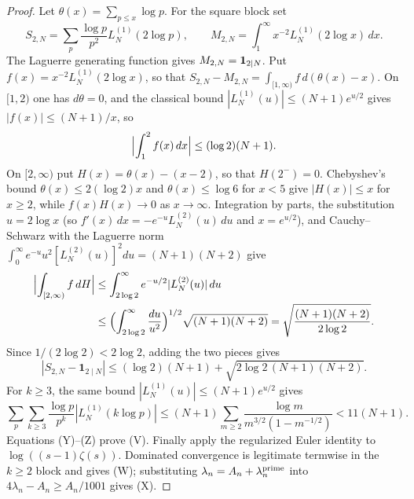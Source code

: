 \documentclass[11pt]{amsart}
\theoremstyle{definition}
\theoremstyle{remark}
\theoremstyle{definition}
\begin{document}
\begin{proof}
Let $\theta(x)=\sum_{p\le x}\log p$.  For the square block set
\[
 S_{2,N}=\sum_p\frac{\log p}{p^2}L_N^{(1)}(2\log p),\qquad
 M_{2,N}=\int_1^\infty x^{-2}L_N^{(1)}(2\log x)\,dx.
\]
The Laguerre generating function gives $M_{2,N}={\bf1}_{2\mid N}$.
Put $f(x)=x^{-2}L_N^{(1)}(2\log x)$, so that
$S_{2,N}-M_{2,N}=\int_{[1,\infty)}f\,d(\theta(x)-x)$.  On $[1,2)$ one has
$d\theta=0$, and the classical bound $|L_N^{(1)}(u)|\le(N+1)e^{u/2}$ \cite[22.14.13]{AbramowitzStegun} gives
$|f(x)|\le(N+1)/x$, so
\[
 \Bigl|\int_1^2f(x)\,dx\Bigr|\le(\log2)(N+1).
\]
On $[2,\infty)$ put $H(x)=\theta(x)-(x-2)$, so that $H(2^-)=0$.  Chebyshev's
bound $\theta(x)\le2(\log2)x$ and $\theta(x)\le\log6$ for $x<5$ give
$|H(x)|\le x$ for $x\ge2$, while $f(x)H(x)\to0$ as $x\to\infty$.
Integration by parts, the substitution $u=2\log x$ (so
$f'(x)\,dx=-e^{-u}L_N^{(2)}(u)\,du$ and $x=e^{u/2}$), and Cauchy--Schwarz
with the Laguerre norm
$\int_0^\infty e^{-u}u^2[L_N^{(2)}(u)]^2du=(N+1)(N+2)$ give
\begin{align*}
 \Bigl|\int_{[2,\infty)}f\,dH\Bigr|
 &\le\int_{2\log2}^\infty e^{-u/2}|L_N^{(2)}(u)|\,du\\
 &\le\Bigl(\int_{2\log2}^\infty\frac{du}{u^2}\Bigr)^{1/2}
    \sqrt{(N+1)(N+2)}
 =\sqrt{\frac{(N+1)(N+2)}{2\log2}}.
\end{align*}
Since $1/(2\log2)<2\log2$, adding the two pieces gives
\[
 |S_{2,N}-{\mathbf 1}_{2\mid N}|
 \le(\log2)(N+1)+\sqrt{2\log2\,(N+1)(N+2)}.                 \tag{Y}
\]
For $k\ge3$, the same bound
$|L_N^{(1)}(u)|\le(N+1)e^{u/2}$ gives
\[
 \sum_p\sum_{k\ge3}\frac{\log p}{p^k}|L_N^{(1)}(k\log p)|
 \le (N+1)\sum_{m\ge2}
       \frac{\log m}{m^{3/2}(1-m^{-1/2})}<11(N+1).           \tag{Z}
\]
Equations (Y)--(Z) prove (V).  Finally apply the regularized Euler identity
to $\log((s-1)\zeta(s))$.  Dominated convergence is legitimate termwise in
the $k\ge2$ block and gives (W); substituting
$\lambda_n=A_n+\lambda_n^{\rm prime}$ into
$4\lambda_n-A_n\ge A_n/1001$ gives (X).
\end{proof}
\end{document}
